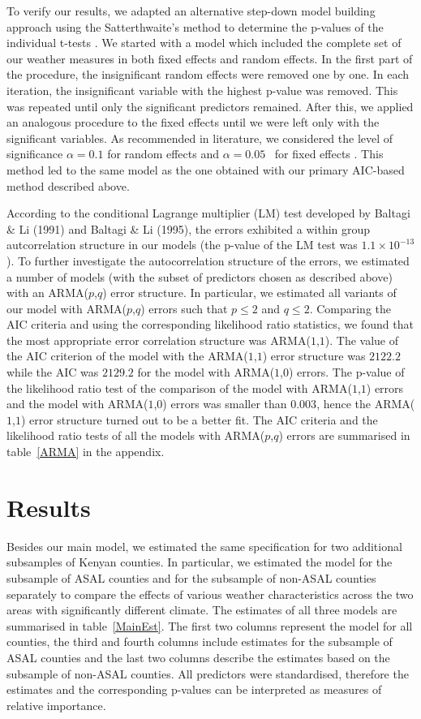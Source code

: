 \documentclass[12pt]{iopart}
\begin{document}
To verify our results, we adapted an alternative step-down model building
approach using the Satterthwaite’s method to determine the p-values of the individual
t-tests \cite{lmerTest}. We started with a model which included the complete set of our weather measures in both fixed effects and random effects. In the first part of the procedure, the insignificant random effects were removed one by one. In each iteration, the insignificant variable with the highest p-value was removed. This was repeated until only the significant predictors remained. After this, we applied an analogous procedure to the fixed effects until we were left only with the significant variables. As recommended in literature, we considered the level of significance $\alpha=0.1$ for random effects and $\alpha=0.05$~ for fixed effects \cite{lmerTest}. This method led to the same model as the one obtained with our primary AIC-based method described above.


According to the conditional Lagrange multiplier (LM) test developed by Baltagi \& Li (1991) and Baltagi \& Li (1995), the errors exhibited a within group autcorrelation structure in our models (the p-value of the LM test was $1.1\times10^{-13}$). To further investigate the autocorrelation structure of the errors, we estimated a number of models (with the subset of predictors chosen as described above) with an ARMA($p$,$q$) error structure. In particular, we estimated all variants of our model with ARMA($p$,$q$) errors such that $p\leq2$ and $q\leq2$. Comparing the AIC criteria and using the corresponding likelihood ratio statistics, we found that the most appropriate error correlation structure was ARMA($1$,$1$). The value of the AIC criterion of the model with the ARMA($1$,$1$) error structure was $2122.2$ while the AIC was $2129.2$ for the model with ARMA($1$,$0$) errors.  The p-value of the likelihood ratio test of the comparison of the model with ARMA($1$,$1$) errors and the model with ARMA($1$,$0$) errors was smaller than $0.003$, hence the ARMA($1$,$1$) error structure turned out to be a better fit. The AIC criteria and the likelihood ratio tests of all the models with ARMA($p$,$q$) errors are summarised in table~\ref{ARMA} in the appendix.

	\section{Results}\label{Results}
	
Besides our main model, we estimated the same specification for two additional subsamples of Kenyan counties. In particular, we estimated the model for the subsample of ASAL counties and for the subsample of non-ASAL counties separately to compare the effects of various weather characteristics across the two areas with significantly different climate. The estimates of all three models are summarised in table~\ref{MainEst}. The first two columns represent the model for all counties, the third and fourth columns include estimates for the subsample of ASAL counties and the last two columns describe the estimates based on the subsample of non-ASAL counties. All predictors were standardised, therefore the estimates and the corresponding p-values can be interpreted as measures of relative importance. 
\end{document}
